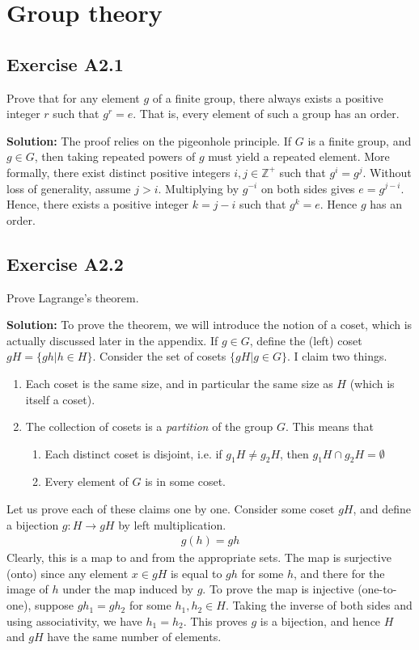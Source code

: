 \documentclass{book}
\begin{document}
\chapter{Group theory}


\section*{Exercise A2.1}
    Prove that for any element $g$ of a finite group, there always exists a positive integer $r$ such that $g^r = e$. That is, every element of such a group has an order.
    
    \textbf{Solution:} The proof relies on the pigeonhole principle. If $G$ is a finite group, and $g\in G$, then taking repeated powers of $g$ must yield a repeated element. More formally, there exist distinct positive integers $i,j \in \mathbb{Z^+}$ such that $g^i = g^j$. Without loss of generality, assume $j>i$. Multiplying by $g^{-i}$ on both sides gives $e = g^{j-i}$. Hence, there exists a positive integer $k=j-i$ such that $g^k = e$. Hence $g$ has an order. 
    
\section*{Exercise A2.2}
    Prove Lagrange's theorem.
    
    \textbf{Solution:} To prove the theorem, we will introduce the notion of a coset, which is actually discussed later in the appendix. If $g\in G$, define the (left) coset $gH = \{gh|h\in H\}$. Consider the set of cosets $\{gH| g\in G\}$. I claim two things.
    \begin{enumerate}
        \item Each coset is the same size, and in particular the same size as $H$ (which is itself a coset).
        \item The collection of cosets is a \emph{partition} of the group $G$. This means that
        \begin{enumerate}
            \item Each distinct coset is disjoint, i.e. if $g_1 H \neq g_2 H$, then $g_1 H \cap g_2 H = \emptyset$
            \item Every element of $G$ is in some coset.
        \end{enumerate}
    \end{enumerate}
    Let us prove each of these claims one by one. Consider some coset $gH$, and define a bijection $g:H\rightarrow gH$ by left multiplication.
    \begin{align}
        g(h) = gh
    \end{align}
    Clearly, this is a map to and from the appropriate sets. The map is surjective (onto) since any element $x\in gH$ is equal to $gh$ for some $h$, and there for the image of $h$ under the map induced by $g$. To prove the map is injective (one-to-one), suppose $gh_1 = gh_2$ for some $h_1, h_2 \in H$. Taking the inverse of both sides and using associativity, we have $h_1 = h_2$. This proves $g$ is a bijection, and hence $H$ and $gH$ have the same number of elements. 
    
\end{document}
